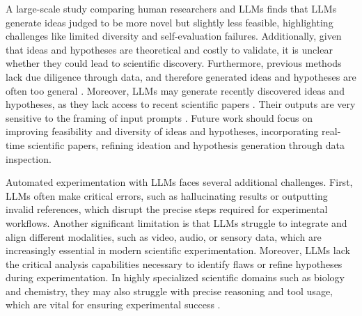 A large-scale study \citep{si2024llmsgeneratenovelresearch} comparing human researchers and LLMs finds that LLMs generate ideas judged to be more novel but slightly less feasible, highlighting challenges like limited diversity and self-evaluation failures.
Additionally, 
given that ideas and hypotheses are theoretical and costly to validate, it is unclear whether they could lead to scientific discovery.
Furthermore, previous methods lack due diligence through data, 
and therefore generated ideas and hypotheses are often too general 
\cite{yang2024moose}. Moreover, LLMs may generate recently discovered ideas and hypotheses, as they lack access to recent scientific papers \cite{liu2024beyond}. Their outputs are very sensitive to the framing of input prompts \cite{park2024can}. Future work should focus on improving feasibility and diversity of ideas and hypotheses, incorporating real-time scientific papers, refining ideation and hypothesis generation through data inspection.

Automated experimentation with LLMs faces several additional challenges. First, LLMs often make critical errors, such as hallucinating results or outputting invalid references, which disrupt the precise steps required for experimental workflows. Another significant limitation is that LLMs struggle to integrate and align different modalities, such as video, audio, or sensory data, which are increasingly essential in modern scientific experimentation. Moreover, LLMs lack the critical analysis capabilities necessary to identify flaws or refine hypotheses during experimentation. In highly specialized scientific domains such as biology and chemistry, they may also struggle with precise reasoning and tool usage, which are vital for ensuring experimental success \cite{reddy2024scientificdiscoverygenerativeai}. %

